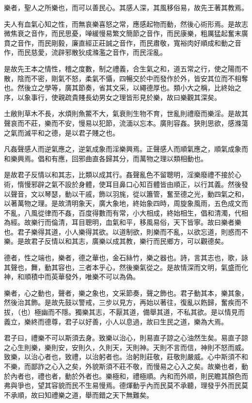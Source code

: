 樂者，聖人之所樂也，而可以善民心。其感人深，其風移俗易，故先王著其教焉。

夫人有血氣心知之性，而無哀樂喜怒之常，應感起物而動，然後心術形焉。是故志微焦衰之音作，而民思憂，啴緩慢易繁文簡節之音作，而民康樂，粗厲猛起奮末廣賁之音作，而民剛毅，廉直經正莊誠之音作，而民肅敬，寬裕肉好順成和動之音作，而民慈愛，流辟邪散狄成滌濫之音作，而民淫亂。

是故先王本之情性，稽之度數，制之禮義，合生氣之和，道五常之行，使之陽而不散，陰而不密，剛氣不怒，柔氣不懾，四暢交於中而發作於外，皆安其位而不相奪也。然後立之學等，廣其節奏，省其文采，以繩德厚也。類小大之稱，比終始之序，以象事行，使親疏貴賤長幼男女之理皆形見於樂，故曰樂觀其深矣。

土敝則草木不長，水煩則魚鱉不大，氣衰則生物不育，世亂則禮廢而樂淫。是故其聲哀而不莊，樂而不安，慢易以犯節，流湎以忘本。廣則容姦。狹則思欲，感滌蕩之氣而滅平和之德，是以君子賤之也。

凡姦聲感人而逆氣應之，逆氣成象而淫樂興焉。正聲感人而順氣應之，順氣成象而和樂興焉。倡和有應，回邪曲直各歸其分，而萬物之理以類相動也。

是故君子反情以和其志，比類以成其行。姦聲亂色不留聰明，淫樂廢禮不接於心術，惰慢邪辟之氣不設於身體，使耳目鼻口心知百體皆由順正，以行其義。然後發以聲音，文以琴瑟，動以干戚，飾以羽旄，從以簫管，奮至德之光，動四氣之和，以著萬物之理。是故清明象天，廣大象地，終始象四時，周旋象風雨，五色成文而不亂，八風從律而不姦，百度得數而有常，小大相成，終始相生，倡和清濁，代相為經。故樂行而倫清，耳目聰明，血氣和平，移風易俗，天下皆寧。故曰樂者樂也。君子樂得其道，小人樂得其欲。以道制欲，則樂而不亂，以欲忘道，則惑而不樂。是故君子反情以和其志，廣樂以成其教，樂行而民鄉方，可以觀德矣。

德者，性之端也，樂者，德之華也，金石絲竹，樂之器也。詩，言其志也，歌，詠其聲也，舞，動其容也，三者本乎心，然後樂氣從之。是故情深而文明，氣盛而化神，和順積中而英華發外，唯樂不可以為偽。

樂者，心之動也，聲者，樂之象也，文采節奏，聲之飾也。君子動其本，樂其象，然後治其飾。是故先鼓以警戒，三步以見方，再始以著往，復亂以飭歸，奮疾而不拔，（也）極幽而不隱。獨樂其志，不厭其道，備舉其道，不私其欲。是以情見而義立，樂終而德尊，君子以好善，小人以息過，故曰生民之道，樂為大焉。

君子曰，禮樂不可以斯須去身。致樂以治心，則易直子諒之心油然生矣。易直子諒之心生則樂，樂則安，安則久，久則天，天則神。天則不言而信，神則不怒而威。致樂，以治心者也，致禮，以治躬者也。治躬則莊敬，莊敬則嚴威。心中斯須不和不樂，而鄙詐之心入之矣，外貌斯須不莊不敬，而慢易之心入之矣。故樂也者，動於內者也，禮也者，動於外者也。樂極和，禮極順。內和而外順，則民瞻其顏色而弗與爭也，望其容貌而民不生易慢焉。德煇動乎內而民莫不承聽，理發乎外而民莫不承順，故曰知禮樂之道，舉而錯之天下無難矣。

